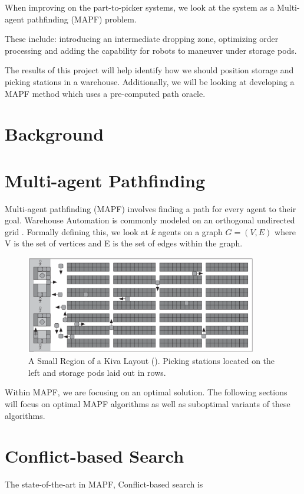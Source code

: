 \documentclass[a4paper,11pt]{article}
\begin{document}
When improving on the part-to-picker systems, we look at the system as a Multi-agent pathfinding (MAPF) problem. 

These include: introducing an intermediate dropping zone, optimizing order processing and adding the capability for robots to maneuver under storage pods.

The results of this project will help identify how we should position storage and picking stations in a warehouse. Additionally, we will be looking at developing a MAPF method which uses a pre-computed path oracle.
\section{Background} \label{sec:background}


\section{Multi-agent Pathfinding}
Multi-agent pathfinding (MAPF) involves finding a path for every agent to their goal. Warehouse Automation is commonly modeled on an orthogonal undirected grid \cite{TODO}. Formally defining this, we look at $k$ agents on a graph $G = (V, E)$ where V is the set of vertices and E is the set of edges within the graph.


\begin{figure}[h]
	\centering
	\includegraphics[width=0.9\textwidth]{graphics/kivasystemlayout}
	\caption{A Small Region of a Kiva Layout (\cite{wurman2008coordinating}). Picking stations located on the left and storage pods laid out in rows.}
	\label{kivalayout1}
\end{figure}

Within MAPF, we are focusing on an optimal solution. The following sections will focus on optimal MAPF algorithms as well as suboptimal variants of these algorithms.

\section{Conflict-based Search}
The state-of-the-art in MAPF, Conflict-based search is 
\end{document}
